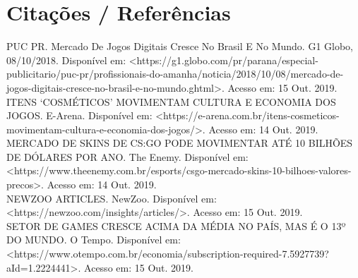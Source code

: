 \chapter*[Citações / Referências]{Citações / Referências}

\noindent
    PUC PR. Mercado De Jogos Digitais Cresce No Brasil E No Mundo. G1 Globo, 08/10/2018. Disponível em: \textless https://g1.globo.com/pr/parana/especial-publicitario/puc-pr/profissionais-do-amanha/noticia/2018/10/08/mercado-de-jogos-digitais-cresce-no-brasil-e-no-mundo.ghtml\textgreater. Acesso em: 15 Out. 2019. \\
    
    \noindent
    ITENS ‘COSMÉTICOS’ MOVIMENTAM CULTURA E ECONOMIA DOS JOGOS. E-Arena. Disponível em: \textless https://e-arena.com.br/itens-cosmeticos-movimentam-cultura-e-economia-dos-jogos/\textgreater. Acesso em: 14 Out. 2019. \\
    
    \noindent
    MERCADO DE SKINS DE CS:GO PODE MOVIMENTAR ATÉ 10 BILHÕES DE DÓLARES POR ANO. The Enemy. Disponível em:\textless https://www.theenemy.com.br/esports/csgo-mercado-skins-10-bilhoes-valores-precos\textgreater. Acesso em: 14 Out. 2019. \\
    
    \noindent
    NEWZOO ARTICLES. NewZoo. Disponível em: \textless https://newzoo.com/insights/articles/\textgreater. Acesso em: 15 Out. 2019. \\
    
    \noindent
    SETOR DE GAMES CRESCE ACIMA DA MÉDIA NO PAÍS, MAS É O 13º DO MUNDO. O Tempo. Disponível em: \textless https://www.otempo.com.br/economia/subscription-required-7.5927739?aId=1.2224441\textgreater. Acesso em: 15 Out. 2019. \\


